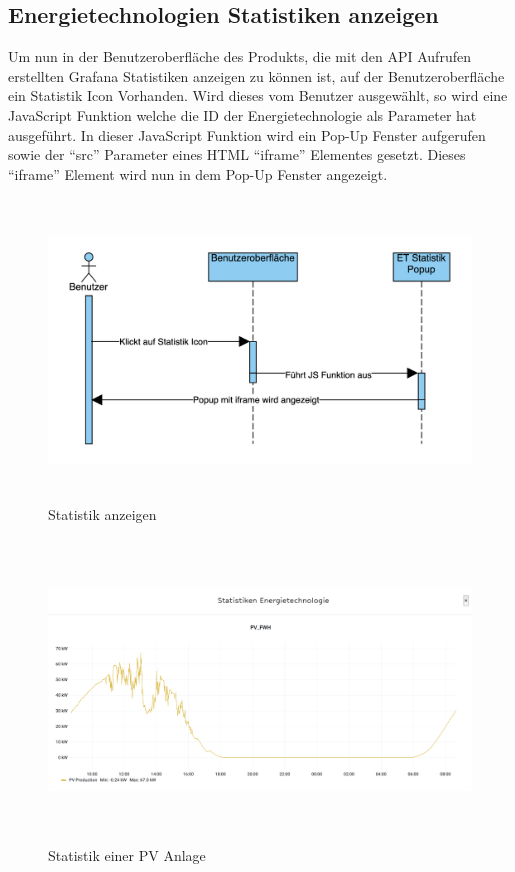 \subsection{Energietechnologien Statistiken anzeigen}
Um nun in der Benutzeroberfläche des Produkts, die mit den API Aufrufen erstellten Grafana Statistiken anzeigen zu können ist, auf der Benutzeroberfläche ein Statistik Icon Vorhanden. Wird dieses vom Benutzer ausgewählt, so wird eine JavaScript Funktion welche die ID der Energietechnologie als Parameter hat ausgeführt. In dieser JavaScript Funktion wird ein Pop-Up Fenster aufgerufen sowie der “src” Parameter eines HTML “iframe” Elementes gesetzt. Dieses “iframe” Element wird nun in dem Pop-Up Fenster angezeigt.
\begin{figure}[h]
	\centering
	\includegraphics[height=8cm,width=14cm]{images/Statistikanzeigen}
	\caption{Statistik anzeigen}
	\label{fig:Statistikanzeigen }
\end{figure} 
\newpage


\begin{figure}[h]
	\centering
	\includegraphics[height=8cm,width=14cm]{images/bspstatistik}
	\caption{Statistik einer PV Anlage}
	\label{fig:Statistikbeispielpv }
\end{figure} 


